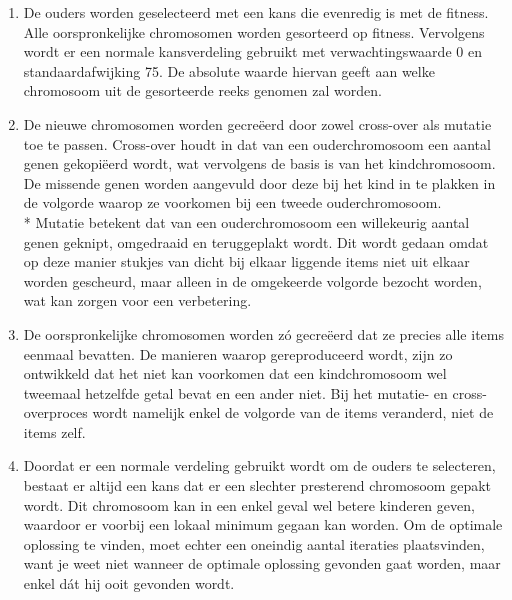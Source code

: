 \documentclass[a4paper,10pt,fleqn]{article}
\begin{document}
\begin{enumerate}[1.]

    \item De ouders worden geselecteerd met een kans die evenredig is met de fitness. Alle oorspronkelijke chromosomen worden gesorteerd op fitness. Vervolgens wordt er een normale kansverdeling gebruikt met verwachtingswaarde 0 en standaardafwijking 75. De absolute waarde hiervan geeft aan welke chromosoom uit de gesorteerde reeks genomen zal worden.

    \item De nieuwe chromosomen worden gecreëerd door zowel cross-over als mutatie toe te passen. Cross-over houdt in dat van een ouderchromosoom een aantal genen gekopiëerd wordt, wat vervolgens de basis is van het kindchromosoom. De missende genen worden aangevuld door deze bij het kind in te plakken in de volgorde waarop ze voorkomen bij een tweede ouderchromosoom.
    \\* Mutatie betekent dat van een ouderchromosoom een willekeurig aantal genen geknipt, omgedraaid en teruggeplakt wordt. Dit wordt gedaan omdat op deze manier stukjes van dicht bij elkaar liggende items niet uit elkaar worden gescheurd, maar alleen in de omgekeerde volgorde bezocht worden, wat kan zorgen voor een verbetering.


    \item De oorspronkelijke chromosomen worden zó gecreëerd dat ze precies alle items eenmaal bevatten. De manieren waarop gereproduceerd wordt, zijn zo ontwikkeld dat het niet kan voorkomen dat een kindchromosoom wel tweemaal hetzelfde getal bevat en een ander niet. Bij het mutatie- en cross-overproces wordt namelijk enkel de volgorde van de items veranderd, niet de items zelf.

    \item Doordat er een normale verdeling gebruikt wordt om de ouders te selecteren, bestaat er altijd een kans dat er een slechter presterend chromosoom gepakt wordt. Dit chromosoom kan in een enkel geval wel betere kinderen geven, waardoor er voorbij een lokaal minimum gegaan kan worden. Om de optimale oplossing te vinden, moet echter een oneindig aantal iteraties plaatsvinden, want je weet niet wanneer de optimale oplossing gevonden gaat worden, maar enkel dát hij ooit gevonden wordt.


\end{enumerate}
\end{document}
